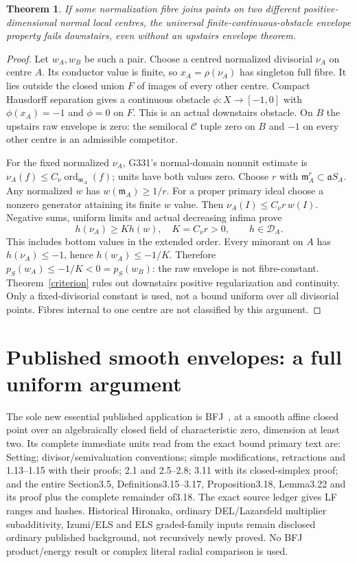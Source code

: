 \documentclass[11pt]{article}
\newtheorem{theorem}{Theorem}
\newcommand{\C}{\mathcal C}
\newcommand{\D}{\mathcal D}
\newcommand{\m}{\mathfrak m}
\newcommand{\aideal}{\mathfrak a}
\begin{document}
\begin{theorem}\label{distinct}
If some normalization fibre joins points on two different positive-dimensional
normal local centres, the universal finite-continuous-obstacle envelope property
fails downstairs, even without an upstairs envelope theorem.
\end{theorem}
\begin{proof}
Let $w_A,w_B$ be such a pair. Choose a centred normalized divisorial $\nu_A$
on centre $A$. Its conductor value is finite, so $x_A=\rho(\nu_A)$ has singleton
full fibre. It lies outside the closed union $F$ of images of every other centre.
Compact Hausdorff separation gives a continuous obstacle $\phi:X\to[-1,0]$
with $\phi(x_A)=-1$ and $\phi=0$ on $F$. This is an actual downstairs obstacle.
On $B$ the upstairs raw envelope is zero: the semilocal $\C$ tuple zero on $B$
and $-1$ on every other centre is an admissible competitor.

For the fixed normalized $\nu_A$, G331's normal-domain nonunit estimate is
$\nu_A(f)\le C_\nu\operatorname{ord}_{\m_A}(f)$; units have both values zero.
Choose $r$ with $\m_A^r\subset\aideal S_A$. Any normalized $w$ has
$w(\m_A)\ge1/r$. For a proper primary ideal choose a nonzero generator
attaining its finite $w$ value. Then
$\nu_A(I)\le C_\nu r\,w(I)$. Negative sums, uniform limits and actual
decreasing infima prove
\[
 h(\nu_A)\ge K h(w),\quad K=C_\nu r>0,
 \qquad h\in\D_A.
\]
This includes bottom values in the extended order. Every minorant on $A$
has $h(\nu_A)\le-1$, hence $h(w_A)\le-1/K$. Therefore
$p_S(w_A)\le-1/K<0=p_S(w_B)$: the raw envelope is not fibre-constant.
Theorem~\ref{criterion} rules out downstairs positive regularization and continuity.
Only a fixed-divisorial constant is used, not a bound uniform over all divisorial
points. Fibres internal to one centre are not classified by this argument.
\end{proof}

\section{Published smooth envelopes: a full uniform argument}\label{sources}
The sole new essential published application is BFJ~\cite{BFJ}, at a smooth
affine closed point over an algebraically closed field of characteristic zero,
dimension at least two. Its complete immediate units read from the exact bound
primary text are: Setting; divisor/semivaluation conventions; simple modifications,
retractions and 1.13--1.15 with their proofs; 2.1 and 2.5--2.8; 3.11 with its
closed-simplex proof; and the entire Section3.5, Definitions3.15--3.17,
Proposition3.18, Lemma3.22 and its proof plus the complete remainder of3.18.
The exact source ledger gives LF ranges and hashes. Historical Hironaka,
ordinary DEL/Lazarsfeld multiplier subadditivity, Izumi/ELS and ELS graded-family
inputs remain disclosed ordinary published background, not recursively newly
proved. No BFJ product/energy result or complex literal radial comparison is used.
\end{document}
